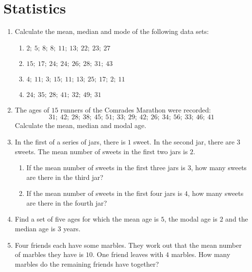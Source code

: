 \chapter{Statistics}
\begin{exercises}{}{
    \begin{enumerate}[noitemsep, label=\textbf{\arabic*}.]
    \item Calculate the mean, median and mode of the following data sets:
      \begin{enumerate}[noitemsep, label=\textbf{(\alph*)} ]
      \item $2;~5;~8;~8;~11;~13;~22;~23;~27$
      \item $15;~17;~24;~24;~26;~28;~31;~43$
      \item $4;~11;~3;~15;~11;~13;~25;~17;~2;~11$
      \item $24;~35;~28;~41;~32;~49;~31$
      \end{enumerate}
    \item The ages of $15$ runners of the Comrades Marathon were recorded:
      \begin{equation*}
        31;~42;~28;~38;~45;~51;~33;~29;~42;~26;~34;~56;~33;~46;~41
      \end{equation*}
      Calculate the mean, median and modal age.
    \item In the first of a series of jars, there is $1$ sweet. In the
      second jar, there are $3$ sweets. The mean number of sweets in the
      first two jars is $2$.
      \begin{enumerate}[noitemsep, label=\textbf{(\alph*)} ]
      \item If the mean number of sweets in the first three jars is $3$, how
        many sweets are there in the third jar?
      \item If the mean number of sweets in the first four jars is $4$, how
        many sweets are there in the fourth jar?
      \end{enumerate}
    \item Find a set of five ages for which the mean age is $5$, the modal
      age is $2$ and the median age is $3$ years.
    \item Four friends each have some marbles. They work out that the mean
      number of marbles they have is $10$. One friend leaves with $4$
      marbles. How many marbles do the remaining friends have together?
\end{enumerate}
}
\end{exercises}


